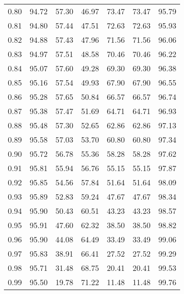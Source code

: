\begin{tabular}{|c|c|c|c|c|c|c|}
      0.80 &     94.72 &     57.30 &      46.97 &   73.47 &      73.47 &         95.79 \\
      0.81 &     94.80 &     57.44 &      47.51 &   72.63 &      72.63 &         95.93 \\
      0.82 &     94.88 &     57.43 &      47.96 &   71.56 &      71.56 &         96.06 \\
      0.83 &     94.97 &     57.51 &      48.58 &   70.46 &      70.46 &         96.22 \\
      0.84 &     95.07 &     57.60 &      49.28 &   69.30 &      69.30 &         96.38 \\
      0.85 &     95.16 &     57.54 &      49.93 &   67.90 &      67.90 &         96.55 \\
      0.86 &     95.28 &     57.65 &      50.84 &   66.57 &      66.57 &         96.74 \\
      0.87 &     95.38 &     57.47 &      51.69 &   64.71 &      64.71 &         96.93 \\
      0.88 &     95.48 &     57.30 &      52.65 &   62.86 &      62.86 &         97.13 \\
      0.89 &     95.58 &     57.03 &      53.70 &   60.80 &      60.80 &         97.34 \\
      0.90 &     95.72 &     56.78 &      55.36 &   58.28 &      58.28 &         97.62 \\
      0.91 &     95.81 &     55.94 &      56.76 &   55.15 &      55.15 &         97.87 \\
      0.92 &     95.85 &     54.56 &      57.84 &   51.64 &      51.64 &         98.09 \\
      0.93 &     95.89 &     52.83 &      59.24 &   47.67 &      47.67 &         98.34 \\
      0.94 &     95.90 &     50.43 &      60.51 &   43.23 &      43.23 &         98.57 \\
      0.95 &     95.91 &     47.60 &      62.32 &   38.50 &      38.50 &         98.82 \\
      0.96 &     95.90 &     44.08 &      64.49 &   33.49 &      33.49 &         99.06 \\
      0.97 &     95.83 &     38.91 &      66.41 &   27.52 &      27.52 &         99.29 \\
      0.98 &     95.71 &     31.48 &      68.75 &   20.41 &      20.41 &         99.53 \\
      0.99 &     95.50 &     19.78 &      71.22 &   11.48 &      11.48 &         99.76 \\
\bottomrule
\end{tabular}
